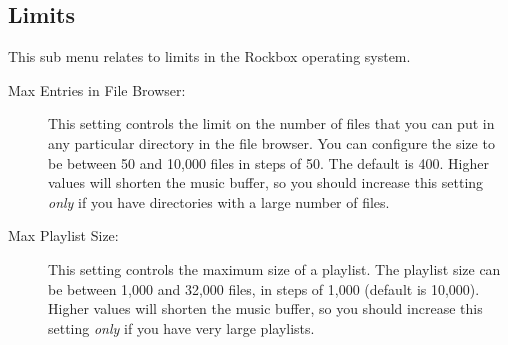 \subsection{Limits}
This sub menu relates to limits in the Rockbox operating system.
  \begin{description}
    \item [Max Entries in File Browser: ]This setting controls the limit on
    the number of files that you can put in any particular directory in the
    file browser. You can configure the size to be between 50 and
    10,000 files in steps of 50. The default is 400. Higher values will shorten
    the music buffer, so you should increase this setting \emph{only} if you have
    directories with a large number of files.

    \item [Max Playlist Size: ]This setting controls the maximum size of
    a playlist. The playlist size can be between 1,000 and 32,000 files,
    in steps of 1,000 (default is 10,000). Higher values will shorten the
    music buffer, so you should increase this setting \emph{only} if you
    have very large playlists.
  \end{description}


